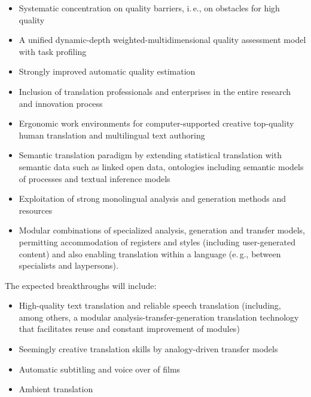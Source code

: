\documentclass[10pt, plain]{../../metanetpaper}
\begin{document}
\begin{multicols}{2}
\begin{itemize}
\item Systematic concentration on quality barriers, i.\,e., on obstacles for high quality
\item A unified dynamic-depth weighted-multidimensional quality assessment model with task profiling
\item Strongly improved automatic quality estimation
\item Inclusion of translation professionals and enterprises in the entire research and innovation process
\item Ergonomic work environments for computer-supported creative top-quality human translation and multilingual text authoring
\item Semantic translation paradigm by extending statistical translation with semantic data such as linked open data, ontologies including semantic models of processes and textual inference models
\item Exploitation of strong monolingual analysis and generation methods and resources
\item Modular combinations of specialized analysis, generation and transfer models, permitting accommodation of registers and styles (including user-generated content) and also enabling translation within a language (e.\,g., between specialists and laypersons).
\end{itemize}

The expected breakthroughs will include:

\begin{itemize}
\item High-quality text translation and reliable speech translation (including, among others, a modular analysis-transfer-generation translation technology that facilitates reuse and constant improvement of modules)
\item Seemingly creative translation skills by analogy-driven transfer models
\item Automatic subtitling and voice over of films
\item Ambient translation
\end{itemize}


\end{multicols}
\end{document}
